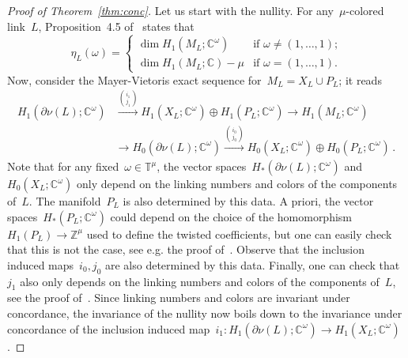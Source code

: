 \documentclass{amsart}
\newcommand{\Z}{\mathbb{Z}}
\newcommand{\C}{\mathbb{C}}
\newcommand{\T}{\mathbb{T}}
\theoremstyle{definition}
\theoremstyle{remark}
\begin{document}
\begin{proof}[Proof of Theorem~\ref{thm:conc}]
	Let us start with the nullity. For any~$\mu$-colored link~$L$, Proposition~4.5 of~\cite{CMP23} states that
	\[
	\eta_L(\omega)=\begin{cases}
		\dim H_1(M_L;\C^\omega)&\text{if $\omega\neq (1,\dots,1)$;}\\
		\dim H_1(M_L;\C)-\mu&\text{if $\omega= (1,\dots,1)$.}
	\end{cases}
	\]
	Now, consider the Mayer-Vietoris exact sequence for~$M_L=X_L\cup P_L$; it reads
	\[
	\begin{aligned}
		H_1(\partial\nu(L);\C^\omega)&\stackrel{{i_1}\choose{j_1}}{\longrightarrow} H_1(X_L;\C^\omega)\oplus H_1(P_L;\C^\omega)\longrightarrow H_1(M_L;\C^\omega)\\
		&\longrightarrow H_0(\partial\nu(L);\C^\omega)\stackrel{{i_0}\choose{j_0}}{\longrightarrow} H_0(X_L;\C^\omega)\oplus H_0(P_L;\C^\omega)\,.
	\end{aligned}
	\]
	Note that for any fixed~$\omega\in\T^\mu$, the vector spaces~$H_*(\partial\nu(L);\C^\omega)$
	and~$H_0(X_L;\C^\omega)$ only depend on the linking numbers and colors of the components of~$L$.
	The manifold~$P_L$ is also determined by this data.
	A priori, the vector spaces~$H_*(P_L;\C^\omega)$ could depend on the choice of the homomorphism~$H_1(P_L)\to\Z^\mu$ used to define the twisted coefficients, but one can easily check that this is not the case, see e.g. the proof of~\cite[Lemma~A.2]{CMP23}.
	Observe that the inclusion induced maps~$i_0,j_0$ are also determined by this data. Finally, one can check that~$j_1$ also only depends on the linking numbers and colors of the components of~$L$, see the proof of~\cite[Lemma~A.2]{CMP23}.
	Since linking numbers and colors are invariant under concordance, the invariance of the nullity now boils down to the invariance under concordance of the inclusion induced map~$i_1\colon H_1(\partial\nu(L);\C^\omega)\to H_1(X_L;\C^\omega)$.
	

\end{proof}
\end{document}
